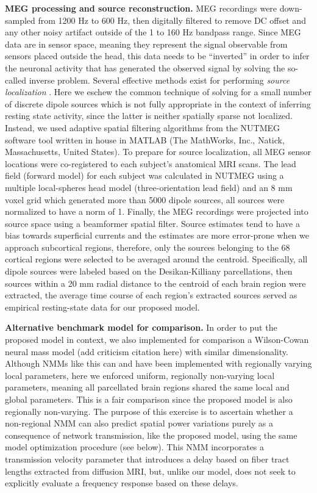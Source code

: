 \textbf{MEG processing and source reconstruction.} MEG recordings were
down-sampled from 1200 Hz to 600 Hz, then digitally filtered to remove
DC offset and any other noisy artifact outside of the 1 to 160 Hz
bandpass range. Since MEG data are in sensor space, meaning they
represent the signal observable from sensors placed outside the head,
this data needs to be ``inverted'' in order to infer the neuronal
activity that has generated the observed signal by solving the so-called
inverse problem. Several effective methods exist for performing
\emph{source localization} \cite{wipf_robust_2010,zumer_probabilistic_2008,jerbi_localization_2004}. Here we eschew the
common technique of solving for a small number of discrete dipole
sources which is not fully appropriate in the context of inferring
resting state activity, since the latter is neither spatially sparse not
localized. Instead, we used adaptive spatial filtering algorithms from
the NUTMEG software tool written in house \cite{dalal_nutmeg_2004} in MATLAB
(The MathWorks, Inc., Natick, Massachusetts, United States). To prepare
for source localization, all MEG sensor locations were co-registered to
each subject's anatomical MRI scans. The lead field (forward model) for
each subject was calculated in NUTMEG using a multiple local-spheres
head model (three-orientation lead field) and an 8 mm voxel grid which
generated more than 5000 dipole sources, all sources were normalized to
have a norm of 1. Finally, the MEG recordings were projected into source
space using a beamformer spatial filter. Source estimates tend to have a
bias towards superficial currents and the estimates are more error-prone
when we approach subcortical regions, therefore, only the sources
belonging to the 68 cortical regions were selected to be averaged around
the centroid. Specifically, all dipole sources were labeled based on the
Desikan-Killiany parcellations, then sources within a 20 mm radial
distance to the centroid of each brain region were extracted, the
average time course of each region's extracted sources served as
empirical resting-state data for our proposed model.

\textbf{Alternative benchmark model for comparison.} In order to put the
proposed model in context, we also implemented for comparison a
Wilson-Cowan neural mass model \cite{destexhe_wilson-cowan_2009,wilson_mathematical_1973,muldoon_stimulation-based_2016} (add criticism citation here) with
similar dimensionality. Although NMMs like this can and have been
implemented with regionally varying local parameters, here we enforced
uniform, regionally non-varying local parameters, meaning all
parcellated brain regions shared the same local and global parameters.
This is a fair comparison since the proposed model is also regionally
non-varying. The purpose of this exercise is to ascertain whether a
non-regional NMM can also predict spatial power variations purely as a
consequence of network transmission, like the proposed model, using the
same model optimization procedure (see below). This NMM incorporates a
transmission velocity parameter that introduces a delay based on fiber
tract lengths extracted from diffusion MRI, but, unlike our model, does
not seek to explicitly evaluate a frequency response based on these
delays.


